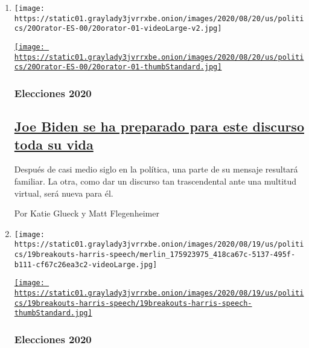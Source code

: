 \begin{enumerate}
\def\labelenumi{\arabic{enumi}.}
\item
  \texttt{[image: https://static01.graylady3jvrrxbe.onion/images/2020/08/20/us/politics/20Orator-ES-00/20orator-01-videoLarge-v2.jpg]}

  \href{/es/2020/08/20/espanol/estados-unidos/joe-biden-discurso.html}{\texttt{[image: https://static01.graylady3jvrrxbe.onion/images/2020/08/20/us/politics/20Orator-ES-00/20orator-01-thumbStandard.jpg]}}

  \hypertarget{elecciones-2020}{%
  \subsubsection{Elecciones 2020}\label{elecciones-2020}}

  \hypertarget{joe-biden-se-ha-preparado-para-este-discurso-toda-su-vida}{%
  \subsection{\texorpdfstring{\href{/es/2020/08/20/espanol/estados-unidos/joe-biden-discurso.html}{Joe
  Biden se ha preparado para este discurso toda su
  vida}}{Joe Biden se ha preparado para este discurso toda su vida}}\label{joe-biden-se-ha-preparado-para-este-discurso-toda-su-vida}}

  Después de casi medio siglo en la política, una parte de su mensaje
  resultará familiar. La otra, como dar un discurso tan trascendental
  ante una multitud virtual, será nueva para él.

  Por Katie Glueck y Matt Flegenheimer
\item
  \texttt{[image: https://static01.graylady3jvrrxbe.onion/images/2020/08/19/us/politics/19breakouts-harris-speech/merlin\_175923975\_418ca67c-5137-495f-b111-cf67c26ea3c2-videoLarge.jpg]}

  \href{/es/2020/08/20/espanol/estados-unidos/kamala-harris-discurso-completo.html}{\texttt{[image: https://static01.graylady3jvrrxbe.onion/images/2020/08/19/us/politics/19breakouts-harris-speech/19breakouts-harris-speech-thumbStandard.jpg]}}

  \hypertarget{elecciones-2020-1}{%
  \subsubsection{Elecciones 2020}\label{elecciones-2020-1}}

  \hypertarget{kamala-harris-habla-de-su-madre-la-inclusiuxf3n-y-el-liderazgo-en-su-discurso-de-aceptaciuxf3n}{%
}
\end{enumerate}
